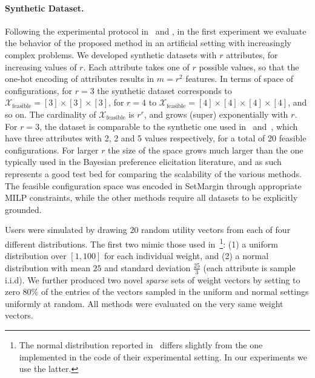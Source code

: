 \documentclass{article}
\renewcommand\[{\begin{equation}}
\renewcommand\]{\end{equation}}
\newcommand{\calvar}[1]{\ensuremath{\mathcal{#1}}}
\newcommand{\calX}{\calvar{X}}
\begin{document}
\paragraph{Synthetic Dataset.} Following the experimental protocol
in~\cite{guo2010real} and \cite{viappiani2010optimal}, in the first
experiment we evaluate the behavior of the proposed method in an
artificial setting with increasingly complex problems. We developed
synthetic datasets with $r$ attributes, for increasing values of $r$.
Each attribute takes one of $r$ possible values, so that the one-hot
encoding of attributes results in $m=r^2$ features. In terms of space
of configurations, for $r=3$ the synthetic dataset corresponds to 
$\calX_\text{feasible} = [3] \times [3] \times [3]$, for $r=4$ to
$\calX_\text{feasible} = [4] \times [4] \times [4] \times [4]$, and so on. The
cardinality of $\calX_\text{feasible}$ is $r^r$, and grows (super)
exponentially with $r$.
For $r=3$, the dataset is comparable to the synthetic one used
in~\cite{guo2010real} and~\cite{viappiani2010optimal}, which have
three attributes with 2, 2 and 5 values respectively, for a total of
20 feasible configurations.  For larger $r$ the size of the space
grows much larger than the one typically used in the Bayesian
preference elicitation literature, and as such represents a good test
bed for comparing the scalability of the various methods. The feasible
configuration space was encoded in {\sc SetMargin} through appropriate
MILP constraints, while the other methods require all datasets to be
explicitly grounded.

Users were simulated by drawing $20$ random utility vectors from each of four
different distributions. The first two mimic those used
in~\cite{guo2010real}\footnote{The normal distribution reported
in~\cite{guo2010real} differs slightly from the one implemented in the code of
their experimental setting. 
In our experiments we use the latter.}:
(1) a uniform distribution over $[1, 100]$ for each individual weight, and (2)
a normal distribution with mean $25$ and %
standard deviation $\frac{25}{3}$ (each attribute is sample i.i.d).  
We further produced two novel
{\em sparse} sets of weight vectors by setting to zero $80\%$ of the entries of the
vectors sampled in the uniform and normal settings uniformly at random. 
All methods were evaluated on the very same weight vectors.
\end{document}
